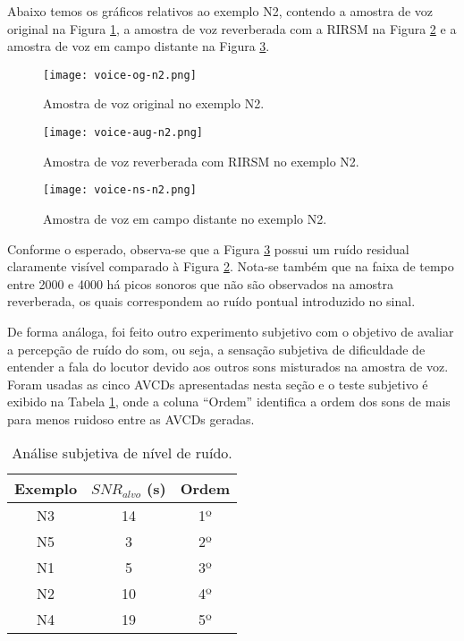 Abaixo temos os gráficos relativos ao exemplo N2, contendo a amostra de voz original na Figura \ref{fig:voice-og-n2}, a amostra de voz reverberada
com a RIRSM na Figura \ref{fig:voice-aug-n2} e a amostra de voz em campo distante na Figura \ref{fig:voice-ns-n2}.

\begin{figure} [H]
    \centering
    \texttt{[image: voice-og-n2.png]}
    \caption{Amostra de voz original no exemplo N2.}
    \label{fig:voice-og-n2}
\end{figure} 

\begin{figure} [H]
    \centering
    \texttt{[image: voice-aug-n2.png]}
    \caption{Amostra de voz reverberada com RIRSM no exemplo N2.}
    \label{fig:voice-aug-n2}
\end{figure} 

\begin{figure} [H]
    \centering
    \texttt{[image: voice-ns-n2.png]}
    \caption{Amostra de voz em campo distante no exemplo N2.}
    \label{fig:voice-ns-n2}
\end{figure} 

Conforme o esperado, observa-se que a Figura \ref{fig:voice-ns-n2} possui um ruído residual claramente visível comparado à Figura \ref{fig:voice-aug-n2}.
Nota-se também que na faixa de tempo entre 2000 e 4000 há picos sonoros que não são observados na amostra reverberada, os quais correspondem ao ruído pontual
introduzido no sinal.

De forma análoga, foi feito outro experimento subjetivo com o objetivo de avaliar a percepção de ruído do som, ou seja, 
a sensação subjetiva de dificuldade de entender a fala do locutor devido aos outros sons misturados na amostra de voz.
Foram usadas as cinco AVCDs apresentadas nesta seção e o teste subjetivo é exibido na Tabela \ref{tbl:noise-exp}, onde
a coluna “Ordem” identifica a ordem dos sons de mais para menos ruidoso entre as AVCDs geradas.

\begin{table} [H]
    \centering
    \caption{Análise subjetiva de nível de ruído.}
    \label{tbl:noise-exp}
    \begin{tabular}{c|c|c}

        \textbf{Exemplo} & 
        \textbf{$SNR_{alvo}$ (s)} & 
        \textbf{Ordem} \\
        \hline 

        N3 & 14 & 1º \\
        N5 &  3 & 2º \\
        N1 &  5 & 3º \\
        N2 & 10 & 4º \\
        N4 & 19 & 5º \\
        

    \end{tabular}
\end{table}

